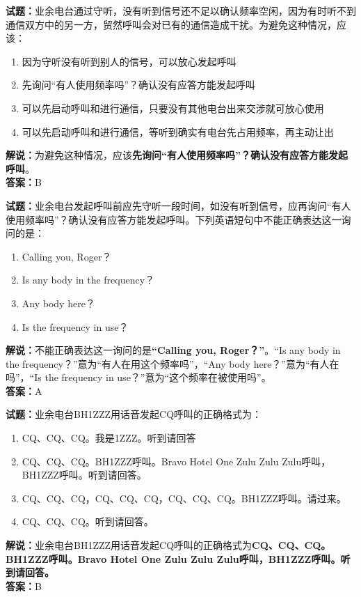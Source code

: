 \documentclass{ctexbook}
\begin{document}
\bigskip


\noindent\textbf{试题：}业余电台通过守听，没有听到信号还不足以确认频率空闲，因为有时听不到通信双方中的另一方，贸然呼叫会对已有的通信造成干扰。为避免这种情况，应该：
\begin{enumerate}[leftmargin=3em]	
	\item 因为守听没有听到别人的信号，可以放心发起呼叫
	\item 先询问“有人使用频率吗”？确认没有应答方能发起呼叫
	\item 可以先启动呼叫和进行通信，只要没有其他电台出来交涉就可放心使用
	\item 可以先启动呼叫和进行通信，等听到确实有电台先占用频率，再主动让出
\end{enumerate}
\noindent\textbf{解说：}为避免这种情况，应该\textbf{先询问“有人使用频率吗”？确认没有应答方能发起呼叫}。\\\noindent\textbf{答案：}B


\bigskip


\noindent\textbf{试题：}业余电台发起呼叫前应先守听一段时间，如没有听到信号，应再询问“有人使用频率吗”？确认没有应答方能发起呼叫。下列英语短句中不能正确表达这一询问的是：
\begin{enumerate}[leftmargin=3em]
	\item Calling you, Roger？
	\item Is any body in the frequency？
	\item Any body here？
	\item Is the frequency in use？
\end{enumerate}
\noindent\textbf{解说：}不能正确表达这一询问的是\textbf{“Calling you, Roger？”}。“Is any body in the frequency？”意为“有人在用这个频率吗”，“Any body here？”意为“有人在吗”，“Is the frequency in use？”意为“这个频率在被使用吗”。\\\noindent\textbf{答案：}A

\bigskip


\noindent\textbf{试题：}业余电台BH1ZZZ用话音发起CQ呼叫的正确格式为：
\begin{enumerate}[leftmargin=3em]
	\item CQ、CQ、CQ。我是1ZZZ。听到请回答
	\item CQ、CQ、CQ。BH1ZZZ呼叫。Bravo Hotel One Zulu Zulu Zulu呼叫，BH1ZZZ呼叫。听到请回答。
	\item CQ、CQ、CQ，CQ、CQ、CQ，CQ、CQ、CQ。BH1ZZZ呼叫。请过来。
	\item CQ、CQ、CQ。听到请回答。
\end{enumerate}
\noindent\textbf{解说：}业余电台BH1ZZZ用话音发起CQ呼叫的正确格式为\textbf{CQ、CQ、CQ。BH1ZZZ呼叫。Bravo Hotel One Zulu Zulu Zulu呼叫，BH1ZZZ呼叫。听到请回答。}\\\noindent\textbf{答案：}B
\end{document}
